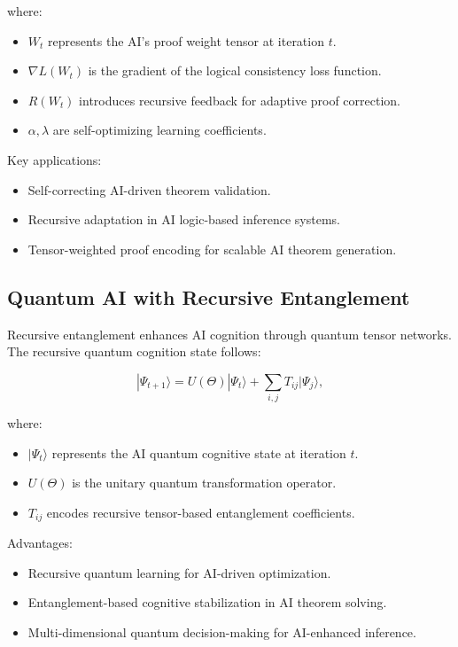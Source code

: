 \documentclass{article}
\theoremstyle{plain}
\begin{document}
where:
\begin{itemize}
    \item $W_t$ represents the AI's proof weight tensor at iteration $t$.
    \item $\nabla L(W_t)$ is the gradient of the logical consistency loss function.
    \item $R(W_t)$ introduces recursive feedback for adaptive proof correction.
    \item $\alpha, \lambda$ are self-optimizing learning coefficients.
\end{itemize}

Key applications:
\begin{itemize}
    \item Self-correcting AI-driven theorem validation.
    \item Recursive adaptation in AI logic-based inference systems.
    \item Tensor-weighted proof encoding for scalable AI theorem generation.
\end{itemize}

\subsection{Quantum AI with Recursive Entanglement}

Recursive entanglement enhances AI cognition through quantum tensor networks. The recursive quantum cognition state follows:

\begin{equation}
|\Psi_{t+1}\rangle = U(\Theta) |\Psi_t\rangle + \sum_{i,j} T_{ij} |\Psi_j\rangle,
\end{equation}

where:
\begin{itemize}
    \item $|\Psi_t\rangle$ represents the AI quantum cognitive state at iteration $t$.
    \item $U(\Theta)$ is the unitary quantum transformation operator.
    \item $T_{ij}$ encodes recursive tensor-based entanglement coefficients.
\end{itemize}

Advantages:
\begin{itemize}
    \item Recursive quantum learning for AI-driven optimization.
    \item Entanglement-based cognitive stabilization in AI theorem solving.
    \item Multi-dimensional quantum decision-making for AI-enhanced inference.
\end{itemize}
\end{document}
